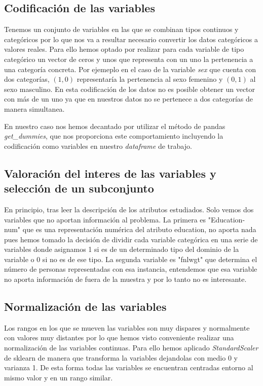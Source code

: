 \documentclass[a4paper,11pt]{article}
\begin{document}
\subsection{Codificación de las variables}

Tenemos un conjunto de variables en las que se combinan tipos continuos y
categóricos por lo que nos va a resultar necesario convertir los datos
categóricos a valores reales. Para ello hemos optado por realizar para cada
variable de tipo categórico un vector de ceros y unos que representa con un uno
la pertenencia a una categoría concreta. Por ejemeplo en el caso de la variable
\textit{sex} que cuenta con dos categorías, $(1,0)$ representaría la pertenencia
al sexo femenino y $(0,1)$ al sexo masculino. En esta codificación de los datos
no es posible obtener un vector con más de un uno ya que en nuestros datos no se
pertenece a dos categorías de manera simultanea.

En nuestro caso nos hemos decantado por utilizar el método de pandas
\textit{get\_dummies}, que nos proporciona este comportamiento incluyendo la
codificación como variables en nuestro \textit{dataframe} de trabajo.

\subsection{Valoración del interes de las variables y selección de un subconjunto}

En principio, tras leer la descripción de los atributos estudiados. Solo vemos
dos variables que no aportan información al problema. La primera es
"Education-num" que es una representación numérica del atributo education, no
aporta nada pues hemos tomado la decisión de dividir cada variable categórica en
una serie de variables donde asignamos 1 si es de un determinado tipo del
dominio de la variable o 0 si no es de ese tipo. La segunda variable es "fnlwgt"
que determina el número de personas representadas con esa instancia, entendemos
que esa variable no aporta información de fuera de la muestra y por lo tanto no
es interesante.

\subsection{Normalización de las variables}

Los rangos en los que se mueven las variables son muy dispares y normalmente con
valores muy distantes por lo que hemos visto conveniente realizar una
normalización de las variables continuas. Para ello hemos aplicado
\textit{StandardScaler} de sklearn de manera que transforma la variables
dejandolas con medio 0 y varianza 1. De esta forma  todas las variables se
encuentran centradas entorno al mismo valor y en un rango similar. 
\end{document}
